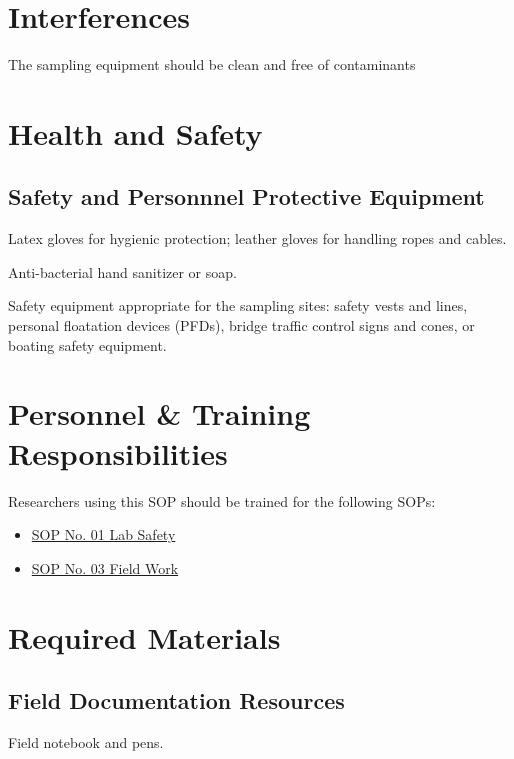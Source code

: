\documentclass[12pt]{../SOP4_alpha}\usepackage[]{graphicx}\usepackage[]{xcolor}
\begin{document}
\section{Interferences}

\NP The sampling equipment should be clean and free of contaminants

\section{Health and Safety}

\subsection{Safety and Personnnel Protective Equipment}

\NP Latex gloves for hygienic protection; leather gloves for handling ropes and cables.  


\NP Anti-bacterial hand sanitizer or soap.

\NP Safety equipment appropriate for the sampling sites: safety vests and lines, personal floatation devices (PFDs), bridge traffic control signs and cones, or boating safety equipment.  

\section{Personnel \& Training Responsibilities}

Researchers using this SOP should be trained for the following SOPs:

\begin{itemize}
  \item \href{https://github.com/marclos/SOPs/blob/master/01_Laboratory_Safety/Laboratory_Safety_v1.04.pdf}{SOP No. 01 Lab Safety}
  \item \href{https://github.com/marclos/SOPs/blob/master/03_Field_Safety/Field_Safety_v1.1.pdf}{SOP No. 03 Field Work}
\end{itemize}

\section{Required Materials}

\subsection{Field Documentation Resources}

\NP Field notebook and pens.  
\end{document}
